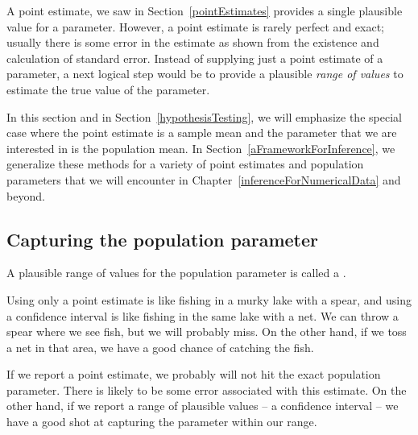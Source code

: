 
A point estimate, we saw in Section~\ref{pointEstimates} provides a single plausible value for a parameter. However, a point estimate is rarely perfect and exact; usually there is some error in the estimate as shown from the existence and calculation of standard error. Instead of supplying just a point estimate of a parameter, a next logical step would be to provide a plausible \emph{range of values} to estimate the true value of the parameter.

In this section and in Section~\ref{hypothesisTesting}, we will emphasize the special case where the point estimate is a sample mean and the parameter that we are interested in is the population mean. In Section~\ref{aFrameworkForInference}, we generalize these methods for a variety of point estimates and population parameters that we will encounter in Chapter~\ref{inferenceForNumericalData} and beyond.

\subsection{Capturing the population parameter}

A plausible range of values for the population parameter is called a .

Using only a point estimate is like fishing in a murky lake with a spear, and using a confidence interval is like fishing in the same lake with a net. We can throw a spear where we see fish, but we will probably miss. On the other hand, if we toss a net in that area, we have a good chance of catching the fish.

If we report a point estimate, we probably will not hit the exact population parameter. There is likely to be some error associated with this estimate. On the other hand, if we report a range of plausible values -- a confidence interval -- we have a good shot at capturing the parameter within our range. 

